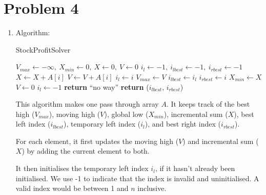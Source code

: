 \documentclass[12pt,a4paper]{article}
\begin{document}
	\newpage
	\section*{Problem 4}
		\begin{enumerate}[label=(\alph*)]
			\item
			Algorithm\footnotemark:
			\begin{algorithm}
				\begin{algorithmic}[1]
					\caption{StockProfitSolver}\label{alg:p4}
						\State $V_{max} \gets -\infty,\ X_{min} \gets 0,\ X \gets 0,\ V \gets 0$
						\State $i_l \gets -1,\ i_{lbest} \gets -1,\ i_{rbest} \gets -1$
							\State $X \gets X + A[i]$
							\State $V \gets V + A[i]$
								\State $i_l \gets i$
							\EndIf
								\State $V_{max} \gets V$
								\State $i_{lbest} \gets i_l$
								\State $i_{rbest} \gets i$
							\EndIf
								\State $X_{min} \gets X$
								\State $V \gets 0$
								\State $i_l \gets -1$
							\EndIf
						\EndFor
							\State \textbf{return} ``no way''
							\Comment{:(}
						\EndIf
						\State \textbf{return} ($i_{lbest}$, $i_{rbest}$)
					\EndFunction
				\end{algorithmic}
			\end{algorithm}


			This algorithm makes one pass through array $A$. It keeps track of the best high ($V_{max}$), moving high ($V$), global low ($X_{min}$), incremental sum ($X$), best left index ($i_{lbest}$), temporary left index ($i_l$), and best right index ($i_{rbest}$).

			For each element, it first updates the moving high ($V$) and incremental sum ($X$) by adding the current element to both.

			It then initialises the temporary left index $i_l$, if it hasn't already been initialised. We use -1 to indicate that the index is invalid and uninitialised. A valid index would be between 1 and $n$ inclusive.


\end{enumerate}
\end{document}
